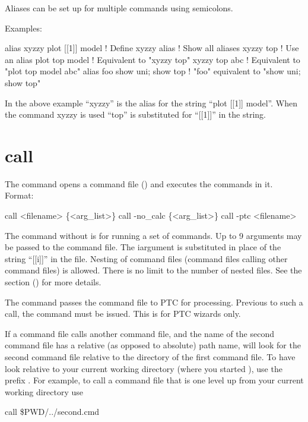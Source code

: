Aliases can be set up for multiple commands using semicolons.

Examples:
\begin{example}
  alias xyzzy plot [[1]] model  ! Define xyzzy
  alias                         ! Show all aliases
  xyzzy top                     ! Use an alias
  plot top model                ! Equivalent to "xyzzy top"
  xyzzy top abc                 ! Equivalent to "plot top model abc"
  alias foo  show uni; show top ! "foo" equivalent to "show uni; show top"
\end{example}
In the above example ``xyzzy'' is the alias for the string ``plot [[1]] model''.  When the
command xyzzy is used ``top'' is substituted for ``[[1]]'' in the string.

\section{call}
\label{s:call}

The  command opens a command file () and executes the commands in
it. Format: 
\vskip 1pt
\begin{example}
  call <filename> \{<arg_list>\}
  call -no_calc \{<arg_list>\}
  call -ptc <filename>
\end{example}

\vskip 1pt 
The  command without  is for running a set of \tao commands.  Up to 9
arguments may be passed to the command file. The i\Th argument is substituted in place of the string
``[[i]]'' in the file. Nesting of command files (command files calling other command files) is
allowed. There is no limit to the number of nested files.  See the 
section () for more details.

The  command passes the command file to PTC for processing. Previous to such a call,
the command  must be issued. This is for PTC wizards only.

If a command file calls another command file, and the name of the second command file has a relative
(as opposed to absolute) path name, \tao will look for the second command file relative to the
directory of the first command file. To have \tao look relative to your current working directory
(where you started \tao), use the prefix . For example, to call a command file that is
one level up from your current working directory use
\begin{example}
  call \$PWD/../second.cmd
\end{example}


